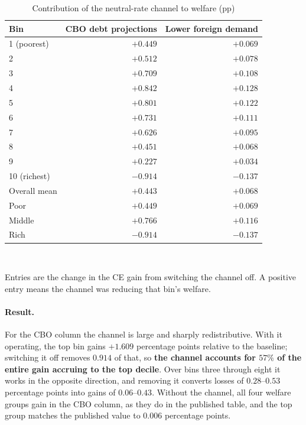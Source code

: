 \begin{table}[t]\centering
\caption{Contribution of the neutral-rate channel to welfare (pp)}\label{tab:channel}
\small
\begin{tabular}{lrr}
\toprule
Bin & CBO debt projections & Lower foreign demand \\
\midrule
1 (poorest) & $+0.449$ & $+0.069$ \\
2           & $+0.512$ & $+0.078$ \\
3           & $+0.709$ & $+0.108$ \\
4           & $+0.842$ & $+0.128$ \\
5           & $+0.801$ & $+0.122$ \\
6           & $+0.731$ & $+0.111$ \\
7           & $+0.626$ & $+0.095$ \\
8           & $+0.451$ & $+0.068$ \\
9           & $+0.227$ & $+0.034$ \\
10 (richest)& $-0.914$ & $-0.137$ \\
\midrule
Overall mean & $+0.443$ & $+0.068$ \\
Poor         & $+0.449$ & $+0.069$ \\
Middle       & $+0.766$ & $+0.116$ \\
Rich         & $-0.914$ & $-0.137$ \\
\bottomrule
\end{tabular}
\\[0.5em]
\parbox{0.83\textwidth}{\footnotesize Entries are the change in the CE gain from
switching the channel off. A positive entry means the channel was reducing that
bin's welfare.}
\end{table}

\paragraph{Result.} For the CBO column the channel is large and sharply
redistributive. With it operating, the top bin gains $+1.609$ percentage points
relative to the baseline; switching it off removes $0.914$ of that, so
\textbf{the channel accounts for $57\%$ of the entire gain accruing to the top
decile}. Over bins three through eight it works in the opposite direction, and
removing it converts losses of $0.28$--$0.53$ percentage points into gains of
$0.06$--$0.43$. Without the channel, all four welfare groups gain in the CBO
column, as they do in the published table, and the top group matches the
published value to $0.006$ percentage points.


